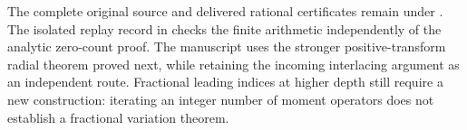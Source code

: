 The complete original source and delivered rational certificates remain
under .
The isolated replay record in 
checks the finite arithmetic independently of the analytic zero-count proof.
The manuscript uses the stronger positive-transform radial theorem proved
next, while retaining the incoming interlacing argument as an independent
route. Fractional leading indices at higher depth still require a new
construction: iterating an integer number of moment operators does not
establish a fractional variation theorem.
